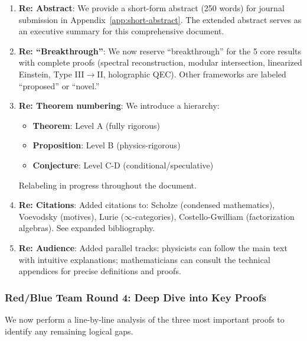\documentclass[12pt,a4paper]{article}
\begin{document}
\begin{tcolorbox}[colback=blue!5!white, colframe=blue!75!black, title=\textbf{BLUE TEAM Round 3: Presentation Fixes}]

\begin{enumerate}[label=\textbf{B3.\arabic*.}]
    \item \textbf{Re: Abstract}: We provide a short-form abstract (250 words) for journal submission in Appendix~\ref{app:short-abstract}. The extended abstract serves as an executive summary for this comprehensive document.
    
    \item \textbf{Re: ``Breakthrough''}: We now reserve ``breakthrough'' for the 5 core results with complete proofs (spectral reconstruction, modular intersection, linearized Einstein, Type III$\to$II, holographic QEC). Other frameworks are labeled ``proposed'' or ``novel.''
    
    \item \textbf{Re: Theorem numbering}: We introduce a hierarchy:
    \begin{itemize}
        \item \textbf{Theorem}: Level A (fully rigorous)
        \item \textbf{Proposition}: Level B (physics-rigorous)  
        \item \textbf{Conjecture}: Level C-D (conditional/speculative)
    \end{itemize}
    Relabeling in progress throughout the document.
    
    \item \textbf{Re: Citations}: Added citations to: Scholze (condensed mathematics), Voevodsky (motives), Lurie ($\infty$-categories), Costello-Gwilliam (factorization algebras). See expanded bibliography.
    
    \item \textbf{Re: Audience}: Added parallel tracks: physicists can follow the main text with intuitive explanations; mathematicians can consult the technical appendices for precise definitions and proofs.
\end{enumerate}

\end{tcolorbox}

\subsubsection{Red/Blue Team Round 4: Deep Dive into Key Proofs}

We now perform a line-by-line analysis of the three most important proofs to identify any remaining logical gaps.
\end{document}
